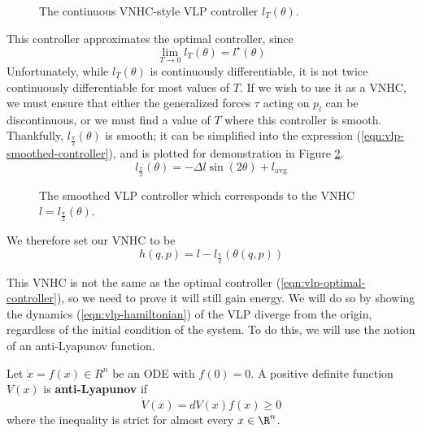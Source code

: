 \begin{figure}
   \centering
   
   \caption{The continuous VNHC-style VLP controller \(l_T(\theta)\).}\label{fig:vlp-T-controller}
\end{figure}

This controller approximates the optimal controller, since 
\[
   \lim\limits_{T \rightarrow 0} l_T(\theta) = l^\star(\theta)
\]
Unfortunately, while \(l_T(\theta)\) is continuously differentiable, it is not
twice continuously differentiable for most values of \(T\).
If we wish to use it as a VNHC, we must ensure that either the generalized
forces \(\tau\) acting on \(p_l\) can be discontinuous, or we must find a value
of \(T\) where this controller is smooth.
Thankfully, \(l_{\frac{\pi}{2}}(\theta)\) is smooth; it can be simplified into
the expression (\ref{eqn:vlp-smoothed-controller}), and is plotted for
demonstration in Figure \ref{fig:vlp-smoothed-controller}.
\begin{equation}\label{eqn:vlp-smoothed-controller}
   l_\frac{\pi}{2}(\theta) = -\Delta l \sin(2\theta) + l_{\text{avg}}
\end{equation}

\begin{figure}
   \centering
   
   \caption{The smoothed VLP controller which corresponds to the VNHC \(l =
      l_\frac{\pi}{2}(\theta)\).}\label{fig:vlp-smoothed-controller}
\end{figure}

We therefore set our VNHC to be
\[
   h(q,p) = l - l_\frac{\pi}{2}\left(\theta(q,p)\right)
\]

This VNHC is not the same as the optimal controller
(\ref{eqn:vlp-optimal-controller}), so we need to prove it will still gain
energy. We will do so by showing the dynamics (\ref{eqn:vlp-hamiltonian}) of the
VLP diverge from the origin, regardless of the initial condition of the system. 
To do this, we will use the notion of an anti-Lyapunov function.

\begin{defn}\label{defn:anti-lyapunov}
   Let \(\dot{x} = f(x) \in R^n\) be an ODE with \(f(0) = 0\). 
   A positive definite function \(V(x)\) is \textbf{anti-Lyapunov} if 
   \[
      \dot{V}(x) = dV(x) f(x) \geq 0
   \]
   where the inequality is strict for almost every \(x \in \R^n\).
\end{defn}

